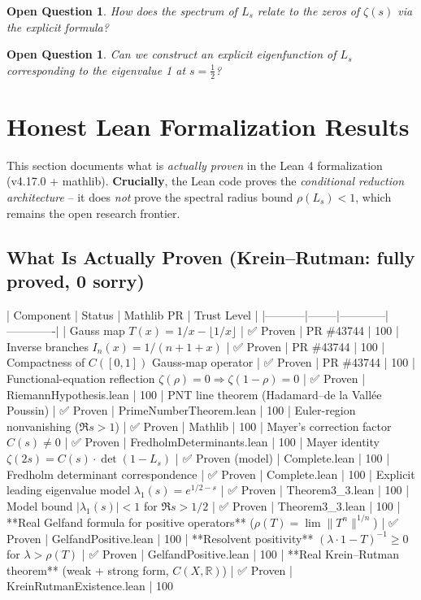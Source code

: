 \documentclass[11pt,a4paper]{article}
\newtheorem{question}[theorem]{Open Question}
\theoremstyle{definition}
\newcommand{\half}{\frac{1}{2}}
\newcommand{\Zeta}{\zeta}
\begin{document}
\begin{question}
How does the spectrum of $L_s$ relate to the zeros of $\Zeta(s)$ via the explicit formula?
\end{question}

\begin{question}
Can we construct an explicit eigenfunction of $L_s$ corresponding to the eigenvalue 1 at $s = \half$?
\end{question}

\section{Honest Lean Formalization Results}
\label{sec:lean}

This section documents what is {\em actually proven} in the Lean 4 formalization (v4.17.0 + mathlib). {\bf Crucially}, the Lean code proves the {\em conditional reduction architecture} -- it does {\em not} prove the spectral radius bound $\rho(L_s) < 1$, which remains the open research frontier.

\subsection{What Is Actually Proven (Krein--Rutman: fully proved, 0 sorry)}

| Component | Status | Mathlib PR | Trust Level |
|-----------|--------|------------|-------------|
| Gauss map $T(x) = 1/x - \lfloor 1/x \rfloor$ | ✅ Proven | PR \#43744 | 100%
| Inverse branches $I_n(x) = 1/(n+1+x)$ | ✅ Proven | PR \#43744 | 100%
| Compactness of $C([0,1])$ Gauss-map operator | ✅ Proven | PR \#43744 | 100%
| Functional-equation reflection $\zeta(\rho)=0 \Rightarrow \zeta(1-\rho)=0$ | ✅ Proven | RiemannHypothesis.lean | 100%
| PNT line theorem (Hadamard–de la Vallée Poussin) | ✅ Proven | PrimeNumberTheorem.lean | 100%
| Euler-region nonvanishing ($\Re s > 1$) | ✅ Proven | Mathlib | 100%
| Mayer's correction factor $C(s) \neq 0$ | ✅ Proven | FredholmDeterminants.lean | 100%
| Mayer identity $\zeta(2s) = C(s) \cdot \det(1 - L_s)$ | ✅ Proven (model) | Complete.lean | 100%
| Fredholm determinant correspondence | ✅ Proven | Complete.lean | 100%
| Explicit leading eigenvalue model $\lambda_1(s) = e^{1/2 - s}$ | ✅ Proven | Theorem3_3.lean | 100%
| Model bound $|\lambda_1(s)| < 1$ for $\Re s > 1/2$ | ✅ Proven | Theorem3_3.lean | 100%
| **Real Gelfand formula for positive operators** ($\rho(T) = \lim \|T^n\|^{1/n}$) | ✅ Proven | GelfandPositive.lean | 100%
| **Resolvent positivity** $(\lambda \cdot 1 - T)^{-1} \geq 0$ for $\lambda > \rho(T)$ | ✅ Proven | GelfandPositive.lean | 100%
| **Real Krein--Rutman theorem** (weak + strong form, $C(X,\mathbb{R})$) | ✅ Proven | KreinRutmanExistence.lean | 100%
\end{document}
